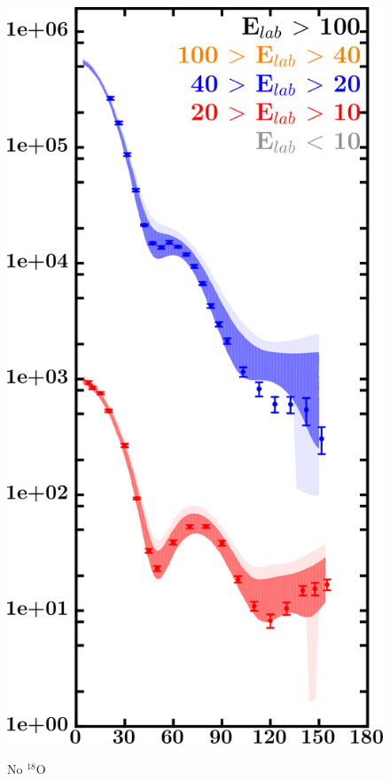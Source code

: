 \documentclass[twocolumn,secnumarabic,amssymb, nobibnotes, aps, prl,
superscriptaddress, nobalancelastpage, draft]{revtex4}
\newcommand{\oEight}{\ensuremath{^{18}}O}
\begin{document}
\begin{figure}[!htb]
\begin{minipage}{0.4\linewidth}
\begin{minipage}[c]{0.5\linewidth}
            \includegraphics[width=\linewidth]{figures/o18_neutronElastic.png}
        \end{minipage}
        \begin{minipage}[c]{0.4\linewidth}
            \centering
            No \oEight\\

\end{minipage}
\end{minipage}
\end{figure}
\end{document}

